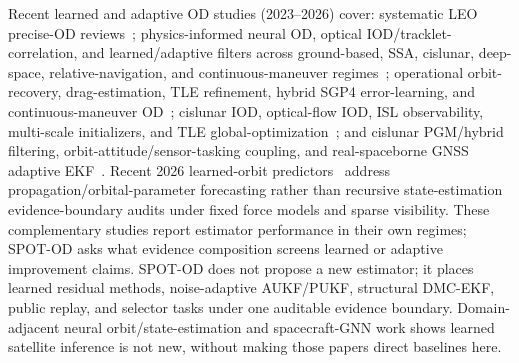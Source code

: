 \documentclass{article}
\begin{document}
Recent learned and adaptive OD studies (2023--2026) cover: systematic LEO precise-OD reviews~\cite{selvan2023precise}; physics-informed neural OD, optical IOD/tracklet-correlation, and learned/adaptive filters across ground-based, SSA, cislunar, deep-space, relative-navigation, and continuous-maneuver regimes~\cite{scorsoglio2023pinn,scorsoglio2026xgeo,ramponi2026pontryagin,zhou2023lstm,zhang2024libration,pinheiro2024flexkalmannet,gao2025heavytailed,sztamfater2026sequential,xu2026arckf,li2026delay,zhang2026hnn,chen2024robust,zhu2025bayesian}; operational orbit-recovery, drag-estimation, TLE refinement, hybrid SGP4 error-learning, and continuous-maneuver OD~\cite{chen2026orbitrecovery,lowe2026drag,belyakov2025satellites,segura2026hybridsgp4,liu2026lowthrustpiecewise}; cislunar IOD, optical-flow IOD, ISL observability, multi-scale initializers, and TLE global-optimization~\cite{smego2026dynamic,heidrich2025collocation,ojedaromero2025adaptivecislunariod,song2026multiconstrainediod,oliveira2026opticalflow,li2026islheterogeneous,zhu2026multiscale,liu2026epsa}; and cislunar PGM/hybrid filtering, orbit-attitude/sensor-tasking coupling, and real-spaceborne GNSS adaptive EKF~\cite{paranjape2026probabilistic,paranjape2026hybridpgm,paul2026mukf_tasking,cossu2026lugre,lang2025starlinkunscented}. Recent 2026 learned-orbit predictors~\cite{liao2026patchtransformer,yang2026lstmtransformerorbit,mahmud2026pinnleo} address propagation/orbital-parameter forecasting rather than recursive state-estimation evidence-boundary audits under fixed force models and sparse visibility. These complementary studies report estimator performance in their own regimes; SPOT-OD asks what evidence composition screens learned or adaptive improvement claims. SPOT-OD does not propose a new estimator; it places learned residual methods, noise-adaptive AUKF/PUKF, structural DMC-EKF, public replay, and selector tasks under one auditable evidence boundary. Domain-adjacent neural orbit/state-estimation and spacecraft-GNN work \cite{varey2024physics,kiprit2026temporalgrid} shows learned satellite inference is not new, without making those papers direct baselines here.
\end{document}
